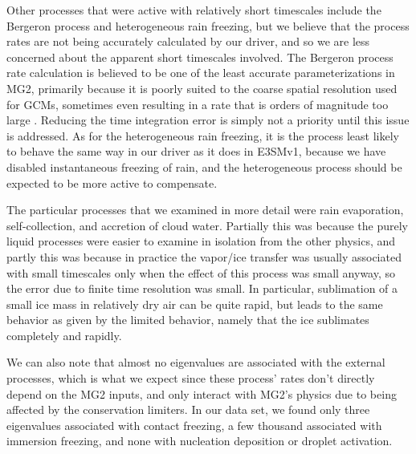 \documentclass [11pt, proquest] {uwthesis}[2020/02/24]
\begin{document}
Other processes that were active with relatively short timescales include the Bergeron process and heterogeneous rain freezing, but we believe that the process rates are not being accurately calculated by our driver, and so we are less concerned about the apparent short timescales involved. The Bergeron process rate calculation is believed to be one of the least accurate parameterizations in MG2, primarily because it is poorly suited to the coarse spatial resolution used for GCMs, sometimes even resulting in a rate that is orders of magnitude too large \parencite{Tan2016,Zhang2019}. Reducing the time integration error is simply not a priority until this issue is addressed. As for the heterogeneous rain freezing, it is the process least likely to behave the same way in our driver as it does in E3SMv1, because we have disabled instantaneous freezing of rain, and the heterogeneous process should be expected to be more active to compensate.

The particular processes that we examined in more detail were rain evaporation, self-collection, and accretion of cloud water.  Partially this was because the purely liquid processes were easier to examine in isolation from the other physics, and partly this was because in practice the vapor/ice transfer was usually associated with small timescales only when the effect of this process was small anyway, so the error due to finite time resolution was small. In particular, sublimation of a small ice mass in relatively dry air can be quite rapid, but leads to the same behavior as given by the limited behavior, namely that the ice sublimates completely and rapidly.

We can also note that almost no eigenvalues are associated with the external processes, which is what we expect since these process' rates don't directly depend on the MG2 inputs, and only interact with MG2's physics due to being affected by the conservation limiters. In our data set, we found only three eigenvalues associated with contact freezing, a few thousand associated with immersion freezing, and none with nucleation deposition or droplet activation.
\end{document}
